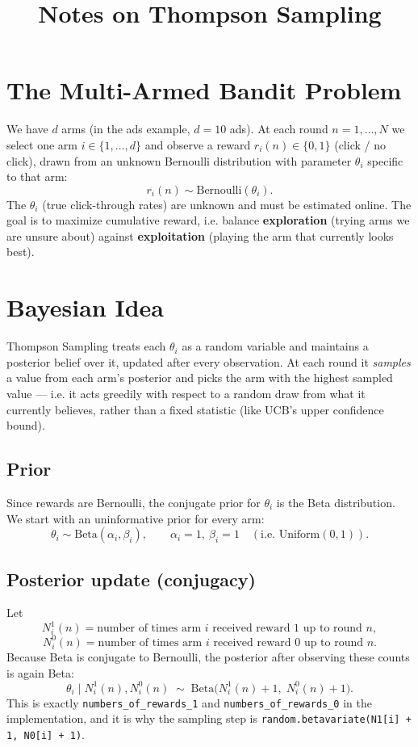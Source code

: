 \documentclass[11pt]{article}
\title{Notes on Thompson Sampling}
\author{}
\date{}
\begin{document}
\maketitle

\section{The Multi-Armed Bandit Problem}

We have $d$ arms (in the ads example, $d = 10$ ads). At each round $n = 1, \dots, N$
we select one arm $i \in \{1, \dots, d\}$ and observe a reward
$r_i(n) \in \{0, 1\}$ (click / no click), drawn from an unknown Bernoulli
distribution with parameter $\theta_i$ specific to that arm:
\[
    r_i(n) \sim \text{Bernoulli}(\theta_i).
\]
The $\theta_i$ (true click-through rates) are unknown and must be estimated
online. The goal is to maximize cumulative reward, i.e. balance
\textbf{exploration} (trying arms we are unsure about) against
\textbf{exploitation} (playing the arm that currently looks best).

\section{Bayesian Idea}

Thompson Sampling treats each $\theta_i$ as a random variable and maintains a
posterior belief over it, updated after every observation. At each round it
\emph{samples} a value from each arm's posterior and picks the arm with the
highest sampled value --- i.e. it acts greedily with respect to a random draw
from what it currently believes, rather than a fixed statistic (like UCB's
upper confidence bound).

\subsection*{Prior}

Since rewards are Bernoulli, the conjugate prior for $\theta_i$ is the
Beta distribution. We start with an uninformative prior for every arm:
\[
    \theta_i \sim \text{Beta}(\alpha_i, \beta_i), \qquad
    \alpha_i = 1,\ \beta_i = 1 \quad (\text{i.e. Uniform}(0,1)).
\]

\subsection*{Posterior update (conjugacy)}

Let
\[
    N_i^1(n) = \text{number of times arm } i \text{ received reward } 1 \text{ up to round } n,
\]
\[
    N_i^0(n) = \text{number of times arm } i \text{ received reward } 0 \text{ up to round } n.
\]
Because Beta is conjugate to Bernoulli, the posterior after observing these
counts is again Beta:
\[
    \theta_i \mid N_i^1(n), N_i^0(n) \;\sim\; \text{Beta}\big(N_i^1(n) + 1,\; N_i^0(n) + 1\big).
\]
This is exactly \texttt{numbers\_of\_rewards\_1} and
\texttt{numbers\_of\_rewards\_0} in the implementation, and it is why the
sampling step is \verb|random.betavariate(N1[i] + 1, N0[i] + 1)|.
\end{document}
